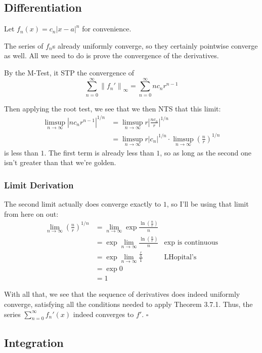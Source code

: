 \documentclass[12pt]{article}
\newcommand{\norm}[1]{\left\lVert#1\right\rVert}
\begin{document}
\subsection{Differentiation}\label{sec:p4p1}

Let $f_n(x)=c_n|x-a|^n$ for convenience.

The series of $f_n$s already uniformly converge, so they certainly pointwise converge as well.
All we need to do is prove the convergence of the derivatives.

By the M-Test, it STP the convergence of
\[\sum_{n=0}^\infty \norm{f_n'}_\infty = \sum_{n=0}^\infty nc_nr^{n-1}\]

Then applying the root test, we see that we then NTS that this limit:
\begin{align*}
    \limsup_{n \to \infty} \left|nc_nr^{n-1}\right|^{1/n}
    &= \limsup_{n \to \infty} r\left|\frac{nc_n}{r}\right|^{1/n} \\
    &= \limsup_{n \to \infty} r |c_n|^{1/n} \cdot \limsup_{n \to \infty} \left(\frac{n}{r}\right)^{1/n}
\end{align*}
is less than $1$.
The first term is already less than $1$, so as long as the second one isn't greater than that we're golden.

\subsubsection{Limit Derivation}

The second limit actually does converge exactly to $1$, so I'll be using that limit from here on out:
\begin{align*}
    \lim_{n \to \infty} \left(\frac{n}{r}\right)^{1/n}
    &= \lim_{n \to \infty} \exp \frac{\ln \left(\frac{n}{r}\right)}{n} \\
    &= \exp \lim_{n \to \infty} \frac{\ln \left(\frac{n}{r}\right)}{n} & \text{$\exp$ is continuous} \\
    &= \exp \lim_{n \to \infty} \frac{\frac{r}{n}}{1} & \text{LHopital's} \\
    &= \exp 0 \\
    &= 1
\end{align*}

With all that, we see that the sequence of derivatives does indeed uniformly converge,
satisfying all the conditions needed to apply Theorem 3.7.1.
Thus, the series $\sum_{n=0}^\infty f_n'(x)$ indeed converges to $f'$. $\square$

\subsection{Integration}
\end{document}
